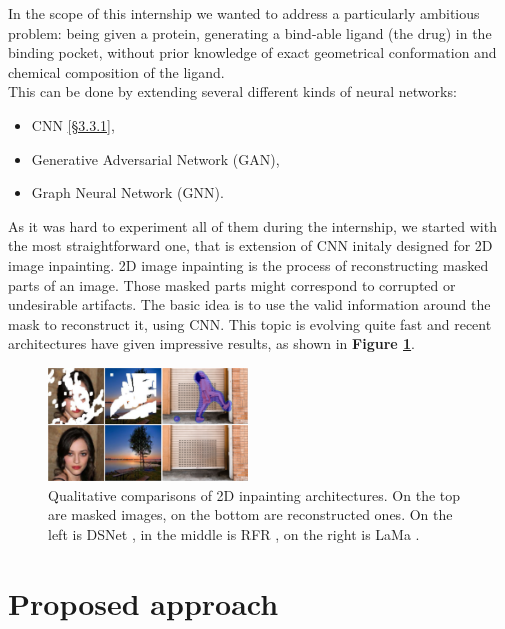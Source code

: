 \documentclass{article}
\begin{document}
In the scope of this internship we wanted to address a particularly ambitious problem: being given a protein, generating a bind-able ligand (the drug) in the binding pocket, without prior knowledge of exact geometrical conformation and chemical composition of the ligand. \\
This can be done by extending several different kinds of neural networks:
\begin{itemize}
    \item CNN \hyperref[sec:cnn]{[\S3.3.1]},
    \item Generative Adversarial Network (GAN),
    \item Graph Neural Network (GNN).
\end{itemize}
As it was hard to experiment all of them during the internship, we started with the most straightforward one, that is extension of CNN initaly designed for 2D image inpainting. 2D image inpainting is the process of reconstructing masked parts of an image. Those masked parts might correspond to corrupted or undesirable artifacts. The basic idea is to use the valid information around the mask to reconstruct it, using CNN. This topic is evolving quite fast and recent architectures have given impressive results, as shown in \textbf{Figure \ref{fig:2d_im_inp}}.
\begin{figure}[H]
    \begin{minipage}{0.5\textwidth}
    \centering
    \includegraphics[height=3cm,width=\textwidth,keepaspectratio]{2d_im_inp.png}
    \end{minipage}
    \begin{minipage}{0.5\textwidth}
    \caption{Qualitative comparisons of 2D inpainting architectures. On the top are masked images, on the bottom are reconstructed ones. On the left is DSNet \cite{DSNet}, in the middle is RFR \cite{RFR}, on the right is LaMa \cite{LaMa}.}
    \label{fig:2d_im_inp}
    \end{minipage}
\end{figure}

\clearpage

\section{Proposed approach}
\end{document}
